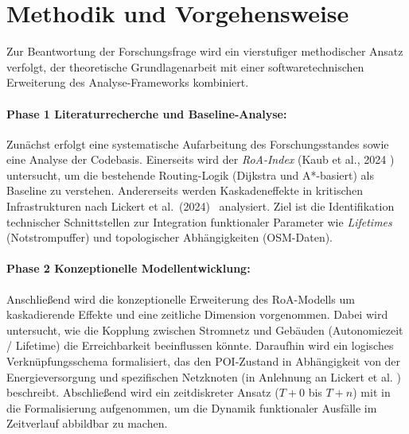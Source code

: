 


\section{Methodik und Vorgehensweise}
\label{sec:methodik-und-vorgehensweise}


Zur Beantwortung der Forschungsfrage wird ein vierstufiger methodischer Ansatz verfolgt, der theoretische Grundlagenarbeit mit einer softwaretechnischen Erweiterung des Analyse-Frameworks kombiniert.

\paragraph{Phase 1 Literaturrecherche und Baseline-Analyse:}
Zunächst erfolgt eine systematische Aufarbeitung des Forschungsstandes sowie eine Analyse der Codebasis.
Einerseits wird der \textit{RoA-Index} (Kaub et al., 2024 \cite{kaub2024}) untersucht, um die bestehende Routing-Logik (Dijkstra und A*-basiert) als Baseline zu verstehen.
Andererseits werden Kaskadeneffekte in kritischen Infrastrukturen nach Lickert et al.\ (2024)~\cite{lickert2024} analysiert.
Ziel ist die Identifikation technischer Schnittstellen zur Integration funktionaler Parameter wie \textit{Lifetimes} (Notstrompuffer) und topologischer Abhängigkeiten (OSM-Daten).

\paragraph{Phase 2 Konzeptionelle Modellentwicklung:}
Anschließend wird die konzeptionelle Erweiterung des RoA-Modells um kaskadierende Effekte und eine zeitliche Dimension vorgenommen.
Dabei wird untersucht, wie die Kopplung zwischen Stromnetz und Gebäuden (Autonomiezeit / Lifetime) die Erreichbarkeit beeinflussen könnte.
Daraufhin wird ein logisches Verknüpfungsschema formalisiert, das den POI-Zustand in Abhängigkeit von der Energieversorgung und spezifischen Netzknoten (in Anlehnung an Lickert et al. \cite{lickert2024}) beschreibt.
Abschließend wird ein zeitdiskreter Ansatz ($T+0$ bis $T+n$) mit in die Formalisierung aufgenommen, um die Dynamik funktionaler Ausfälle im Zeitverlauf abbildbar zu machen.

